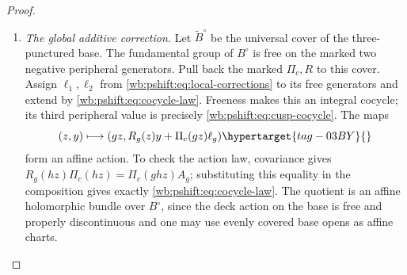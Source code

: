 \begin{proof}
\begin{enumerate}[label=\arabic*.,leftmargin=*]
The affine cocycle convention in \eqref{wb:pshift:eq:local-affine-cocycle} has multiplication law
\begin{equation}
                    \ell_{gh}=\ell_g+A_g\ell_h.
 \hypertarget{tag-03C0}{}\label{wb:pshift:eq:cocycle-law}
\end{equation}
Since $g_0=(g_1g_2)^{-1}$, it gives
\begin{equation}
\begin{aligned}
 \ell_1+A_1\ell_2
   &=-\frac{3n}{2}\widehat w+\frac n2\widehat\delta,\\
 \ell_0=-A_{g_0}(\ell_1+A_1\ell_2)
   &=\frac{3n}{2}\widehat w-\frac n2\widehat\delta.
\end{aligned}
\hypertarget{tag-03C4}{}\label{wb:pshift:eq:cusp-cocycle}
\end{equation}
Here $A_{g_0}$ fixes both toric lattice vectors, as is also immediate
from $A_{g_0}=\left(\begin{smallmatrix}I&0\\B_0&I\end{smallmatrix}\right)$.
Put
\begin{equation}
 q_n=(-3n/2,n/2)^{\mathsf t}\in\mathbb Z^2,
                  \qquad a_0(z)=s(z)q_n.
 \hypertarget{tag-03C6}{}\label{wb:pshift:eq:cusp-translation}
\end{equation}
Then $a_0(g_0z)-a_0(z)=-q_n=\Pi_c(g_0z)\ell_0$, exactly as
required by \eqref{wb:pshift:eq:local-affine-cocycle}. Exponentiating gives the map
$(x,t_c)\mapsto(t_c^{q_n}x,t_c)$ on the dense cusp torus.
It extends holomorphically and invertibly to the marked infinite fan:
the integral map
\[
 (y,y_3)\longmapsto(y+y_3q_n,y_3)
\]
translates each height-one triangle by the integer vector $q_n$ and
therefore permutes the cones, with inverse given by $-q_n$.
It commutes with the cusp quotient action in \eqref{wb:pshift:eq:cusp-actions-identical}. This proves extension across every cusp stratum.
\item \emph{The global additive correction.}
Let $\widetilde B^\circ$ be
the universal cover of the three-punctured base. The fundamental group
of $B^\circ$ is free on the marked two negative peripheral generators. Pull back
the marked $\Pi_c,R$ to this cover. Assign $\ell_1,\ell_2$ from
\eqref{wb:pshift:eq:local-corrections} to its free generators and extend by \eqref{wb:pshift:eq:cocycle-law}. Freeness makes
this an integral cocycle; its third peripheral value is
precisely \eqref{wb:pshift:eq:cusp-cocycle}. The maps
\begin{equation}
 (z,y)\longmapsto
       (gz,R_g(z)y+\Pi_c(gz)\ell_g)
 \hypertarget{tag-03BY}{}\label{wb:pshift:eq:affine-bundle-action}
\end{equation}
form an affine action. To check the action law, covariance gives
$R_g(hz)\Pi_c(hz)=\Pi_c(ghz)A_g$; substituting this equality
in the composition gives exactly \eqref{wb:pshift:eq:cocycle-law}.
The quotient is an affine holomorphic bundle over $B^\circ$, since
the deck action on the base is free and properly discontinuous and
one may use evenly covered base opens as affine charts.


\end{enumerate}
\end{proof}
